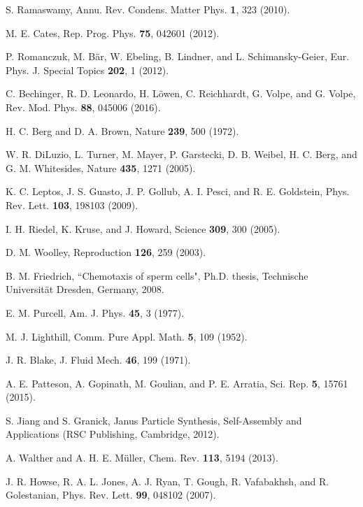 \documentclass[aps,pre,preprint,superscriptaddress,amsmath,amssymb,nofootinbib]{revtex4}
\begin{document}
	
\begin{thebibliography}{100}
	
{S. Ramaswamy}, {Annu. Rev. Condens. Matter Phys.} {\bf 1}, {323} {(2010)}.	

{M. E. Cates}, {Rep. Prog. Phys.} {\bf 75}, {042601} {(2012)}.

{P. Romanczuk, M. B\"ar, W. Ebeling, B. Lindner, and L. Schimansky-Geier}, {Eur. Phys. J. Special Topics} {\bf 202}, {1} {(2012)}.

{C. Bechinger, R. D. Leonardo, H. L\"owen, C. Reichhardt, G. Volpe, and G. Volpe}, {Rev. Mod. Phys.} {\bf 88}, {045006} {(2016)}.

{H. C. Berg and D. A. Brown}, {Nature} {\bf 239}, {500} {(1972)}.


{W. R. DiLuzio, L. Turner, M. Mayer, P. Garstecki, D. B. Weibel, H. C. Berg, and G. M. Whitesides}, {Nature} {\bf 435}, {1271} {(2005)}.


{K. C. Leptos, J. S. Guasto, J. P. Gollub, A. I. Pesci, and R. E. Goldstein}, {Phys. Rev. Lett.} {\bf 103}, {198103} {(2009)}.

{I. H. Riedel, K. Kruse, and J. Howard}, {Science} {\bf 309}, {300} {(2005)}.

{D. M. Woolley}, {Reproduction} {\bf 126}, {259} {(2003)}.


{B. M. Friedrich}, {``Chemotaxis of sperm cells"},  {Ph.D. thesis, Technische Universit\"at Dresden, Germany, 2008}.


{E. M. Purcell}, {Am. J. Phys.} {\bf 45}, {3} {(1977)}.

{M. J. Lighthill}, {Comm. Pure Appl. Math.} {\bf 5}, {109} {(1952)}.

{J. R. Blake}, {J. Fluid Mech.} {\bf 46}, {199} {(1971)}.

{A. E. Patteson, A. Gopinath, M. Goulian, and P. E. Arratia}, {Sci. Rep.} {\bf 5}, {15761} {(2015)}.

{S. Jiang and S. Granick}, {Janus Particle Synthesis, Self-Assembly and Applications} {(RSC Publishing, Cambridge, 2012)}.

{A. Walther and A. H. E. M\"uller}, {Chem. Rev.} {\bf 113}, {5194} {(2013)}.

{J. R. Howse, R. A. L. Jones, A. J. Ryan, T. Gough, R. Vafabakhsh, and R. Golestanian}, {Phys. Rev. Lett.} {\bf 99}, {048102} {(2007)}.


\end{thebibliography}
\end{document}
